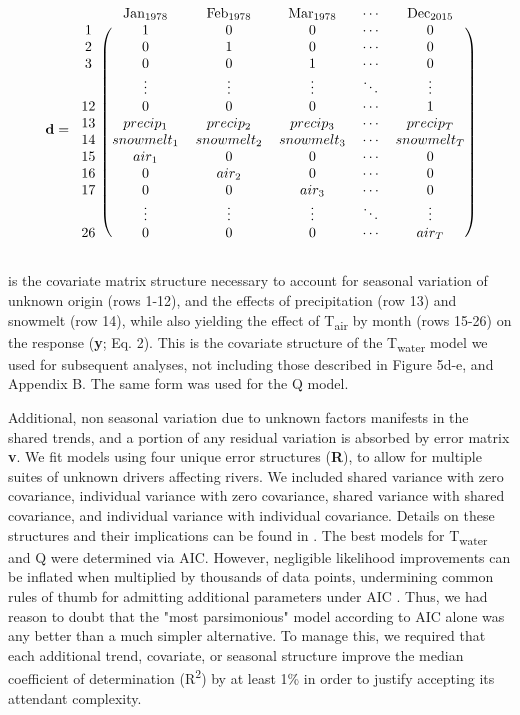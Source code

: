 \documentclass[notitlepage]{article}
\begin{document}
$$
\textbf{d} = \begin{blockarray}{cccccc}
& \textrm{Jan}_{1978} & \textrm{Feb}_{1978} & \textrm{Mar}_{1978} & \cdots & \textrm{Dec}_{2015} \\
\begin{block}{c(ccccc)}
    1 & 1 & 0 & 0 & \cdots & 0 \\
    2 & 0 & 1 & 0 & \cdots & 0 \\
    3 & 0 & 0 & 1 & \cdots & 0 \\
      & \vdots & \vdots & \vdots & \ddots & \vdots \\
    12 & 0 & 0 & 0 & \cdots & 1 \\
    13 & precip_1 & precip_2 & precip_3 & \cdots & precip_T \\
    14 & snowmelt_1 & snowmelt_2 & snowmelt_3 & \cdots & snowmelt_T \\
    15 & air_1 & 0 & 0 & \cdots & 0 \\
    16 & 0 & air_2 & 0 & \cdots & 0 \\
    17 & 0 & 0 & air_3 & \cdots & 0 \\
      & \vdots & \vdots & \vdots & \ddots & \vdots \\
    26 & 0 & 0 & 0 & \cdots & air_T \\
\end{block}
\end{blockarray}
$$

\noindent
is the covariate matrix structure necessary to account for seasonal variation of unknown origin (rows 1-12), and the effects of precipitation (row 13) and snowmelt (row 14), while also yielding the effect of T\textsubscript{air} by month (rows 15-26) on the response (\textbf{y}; Eq. 2). This is the covariate structure of the T\textsubscript{water} model we used for subsequent analyses, not including those described in Figure 5d-e, and Appendix B. The same form was used for the Q model.

Additional, non seasonal variation due to unknown factors manifests in the shared trends, and a portion of any residual variation is absorbed by error matrix \textbf{v}. We fit models using four unique error structures (\textbf{R}), to allow for multiple suites of unknown drivers affecting rivers. We included shared variance with zero covariance, individual variance with zero covariance, shared variance with shared covariance, and individual variance with individual covariance. Details on these structures and their implications can be found in \citep{holmes2012marss}. The best models for T\textsubscript{water} and Q were determined via AIC. However, negligible likelihood improvements can be inflated when multiplied by thousands of data points, undermining common rules of thumb for admitting additional parameters under AIC \citep{burnham2003model}. Thus, we had reason to doubt that the "most parsimonious" model according to AIC alone was any better than a much simpler alternative. To manage this, we required that each additional trend, covariate, or seasonal structure improve the median coefficient of determination (R\textsuperscript{2}) by at least 1\% in order to justify accepting its attendant complexity.
\end{document}
